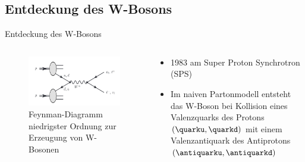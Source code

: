 \documentclass[aspectratio=1610, 9pt]{beamer}
\begin{document}
\subsection{Entdeckung des W-Bosons}
\begin{frame}{Entdeckung des W-Bosons}
  \begin{columns}
    \begin{column}{0.4\textwidth}
      \begin{figure}
        \includegraphics[width=\textwidth]{images/feynman.png}
        \caption{Feynman-Diagramm niedrigster Ordnung zur Erzeugung von W-Bosonen \cite{skript}}
        \label{fig:feynman}
      \end{figure}
    \end{column}
    \begin{column}{0.4\textwidth}
      \begin{itemize}
        \item 1983 am Super Proton Synchrotron (SPS)
        \item Im naiven Partonmodell entsteht das W-Boson bei Kollision eines Valenzquarks des Protons $(\quarku, \quarkd)$ mit einem Valenzantiquark des Antiprotons $(\antiquarku, \antiquarkd)$
      \end{itemize}
    \end{column}
  \end{columns}



\end{frame}
\end{document}
